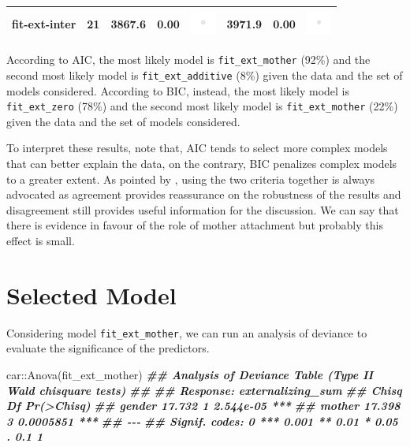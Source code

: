 \documentclass[
]{book}
\newenvironment{Shaded}{\begin{snugshade}}{\end{snugshade}}
\newcommand{\DocumentationTok}[1]{\textcolor[rgb]{0.56,0.35,0.01}{\textbf{\textit{#1}}}}
\newcommand{\FunctionTok}[1]{\textcolor[rgb]{0.00,0.00,0.00}{#1}}
\newcommand{\NormalTok}[1]{#1}
\newcommand{\SpecialCharTok}[1]{\textcolor[rgb]{0.00,0.00,0.00}{#1}}
\begin{document}
\begin{table}[!h]
{\begin{tabular}[t]{rccc>{\centering\arraybackslash}m{1cm}cc>{\centering\arraybackslash}m{1cm}}
fit-ext-inter & 21 & 3867.6 & 0.00 & \includegraphics[width=0.33in, height=0.33in]{images/ball_AIC_ext_inter.png} & 3971.9 & 0.00 & \includegraphics[width=0.33in, height=0.33in]{images/ball_BIC_ext_inter.png}\\
\bottomrule
\end{tabular}}
\end{table}

According to AIC, the most likely model is \texttt{fit\_ext\_mother} (92\%) and the second most likely model is \texttt{fit\_ext\_additive} (8\%) given the data and the set of models considered. According to BIC, instead, the most likely model is \texttt{fit\_ext\_zero} (78\%) and the second most likely model is \texttt{fit\_ext\_mother} (22\%) given the data and the set of models considered.

To interpret these results, note that, AIC tends to select more complex models that can better explain the data, on the contrary, BIC penalizes complex models to a greater extent. As pointed by \citet{kuhaAICBICComparisons2004}, using the two criteria together is always advocated as agreement provides reassurance on the robustness of the results and disagreement still provides useful information for the discussion. We can say that there is evidence in favour of the role of mother attachment but probably this effect is small.

\hypertarget{selected-model}{%
\section{Selected Model}\label{selected-model}}

Considering model \texttt{fit\_ext\_mother}, we can run an analysis of deviance to evaluate the significance of the predictors.

\begin{Shaded}
\begin{Highlighting}[]
\NormalTok{car}\SpecialCharTok{::}\FunctionTok{Anova}\NormalTok{(fit\_ext\_mother)}
\DocumentationTok{\#\# Analysis of Deviance Table (Type II Wald chisquare tests)}
\DocumentationTok{\#\# }
\DocumentationTok{\#\# Response: externalizing\_sum}
\DocumentationTok{\#\#         Chisq Df Pr(\textgreater{}Chisq)    }
\DocumentationTok{\#\# gender 17.732  1  2.544e{-}05 ***}
\DocumentationTok{\#\# mother 17.398  3  0.0005851 ***}
\DocumentationTok{\#\# {-}{-}{-}}
\DocumentationTok{\#\# Signif. codes:  0 \textquotesingle{}***\textquotesingle{} 0.001 \textquotesingle{}**\textquotesingle{} 0.01 \textquotesingle{}*\textquotesingle{} 0.05 \textquotesingle{}.\textquotesingle{} 0.1 \textquotesingle{} \textquotesingle{} 1}
\end{Highlighting}
\end{Shaded}
\end{document}

